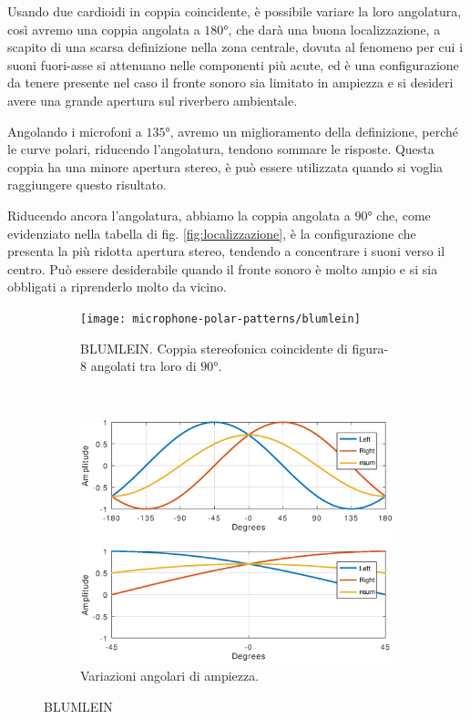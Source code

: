 Usando due cardioidi in coppia coincidente, è possibile variare la loro
angolatura, così avremo una coppia angolata a $180°$, che darà una buona
localizzazione, a scapito di una scarsa definizione nella zona centrale,
dovuta al fenomeno per cui i suoni fuori-asse si attenuano nelle componenti più
acute, ed è una configurazione da tenere presente nel caso il fronte sonoro
sia limitato in ampiezza e si desideri avere una grande apertura sul
riverbero ambientale.

Angolando i microfoni a $135°$, avremo un miglioramento
della definizione, perché le curve polari, riducendo l’angolatura, tendono
sommare le risposte. Questa coppia ha una minore apertura stereo, è può essere
utilizzata quando si voglia raggiungere questo risultato.

Riducendo ancora l’angolatura, abbiamo la coppia angolata a $90°$ che, come
evidenziato nella tabella di fig. \ref{fig:localizzazione}, è la configurazione
che presenta la più ridotta apertura stereo, tendendo a concentrare i suoni
verso il centro. Può essere desiderabile quando il fronte sonoro è molto ampio
e si sia obbligati a riprenderlo molto da vicino.

\clearpage

\begin{figure}[t]
    \centering
    \begin{subfigure}[t]{0.99\textwidth}
        \centering
        \texttt{[image: microphone-polar-patterns/blumlein]}
        \caption[]{BLUMLEIN. Coppia stereofonica coincidente di figura-8 angolati tra loro di $90°$.}%
        \label{pol:blumleinsp}
    \end{subfigure}%
    \\
    \begin{subfigure}[t]{0.99\textwidth}
        \centering
        \includegraphics[width=12.5cm]{CAPITOLI/1000/IMG/blumleinsub}
        \caption[]{Variazioni angolari di ampiezza.}%
        \label{plot:blumlein}
    \end{subfigure}
    \caption[]{BLUMLEIN}
    \label{sp:blumlein}
\end{figure}

